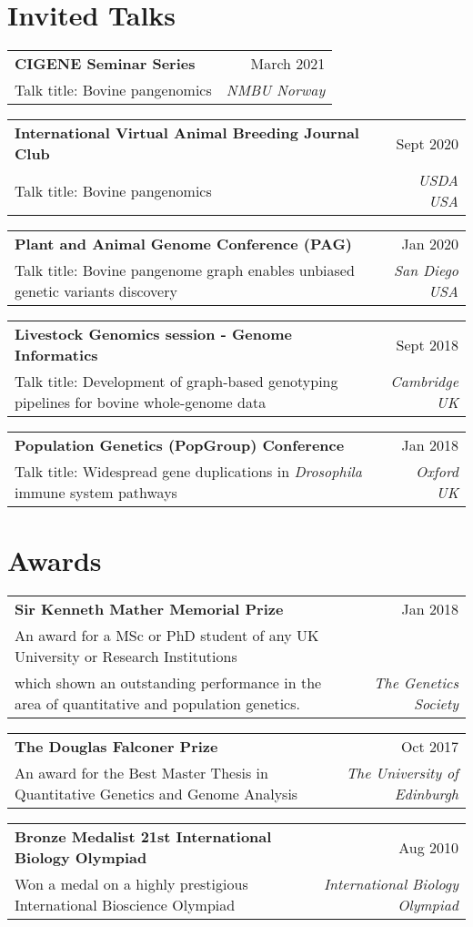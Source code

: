 \documentclass[letterpaper,10pt]{article}
\makeatletter
\newcommand{\resumetalk}[4]{\small{
  \vspace{-2pt}\item
    \begin{tabular*}{0.97\textwidth}[t]{l@{\extracolsep{\fill}}r}
      \textbf{#1} & #2 \\
      \small#3 & \textit{\small #4} \\
    \end{tabular*}\vspace{-4pt}
    }
}
\newcommand{\resumeSubHeadingListStart}{\begin{itemize}[leftmargin=0.15in, label={}]}
\newcommand{\resumeSubHeadingListEnd}{\end{itemize}}
\makeatother
\begin{document}
\section{Invited Talks}
   
 \resumeSubHeadingListStart
 \small{
 
    \resumetalk {CIGENE Seminar Series}{March 2021}
      {Talk title: Bovine pangenomics}{NMBU Norway}
      \resumetalk {International Virtual Animal Breeding Journal Club}{Sept 2020}
      {Talk title: Bovine pangenomics}{USDA USA}
   \resumetalk {Plant and Animal Genome Conference (PAG)}{Jan 2020}
      {Talk title: Bovine pangenome graph enables unbiased genetic variants discovery}{San Diego USA}
      
  \resumetalk {Livestock Genomics session - Genome Informatics}{Sept 2018}
     {Talk title: Development of graph-based genotyping pipelines for bovine whole-genome data}{Cambridge UK}
     
    \resumetalk {Population Genetics (PopGroup) Conference }{Jan 2018}
     {Talk title: Widespread gene duplications in \textit{Drosophila} immune system pathways}{Oxford UK}
     
      
    }
\resumeSubHeadingListEnd
    
\section{Awards}
   
 \resumeSubHeadingListStart
 \small{
 
    \resumetalk {Sir Kenneth Mather Memorial Prize}{Jan 2018}
      {An award for a MSc or PhD student of any UK University or Research Institutions \\ which shown an outstanding performance in the area of quantitative and population genetics. }{The Genetics Society}
    \resumetalk {The Douglas Falconer Prize }{Oct 2017}
      {An award for the Best Master Thesis in Quantitative Genetics and Genome Analysis}{The University of Edinburgh}
   \resumetalk {Bronze Medalist 21st International Biology Olympiad}{Aug 2010}
      {Won a medal on a highly prestigious International Bioscience Olympiad}{International Biology Olympiad}
     
      
    }
\resumeSubHeadingListEnd
\end{document}
